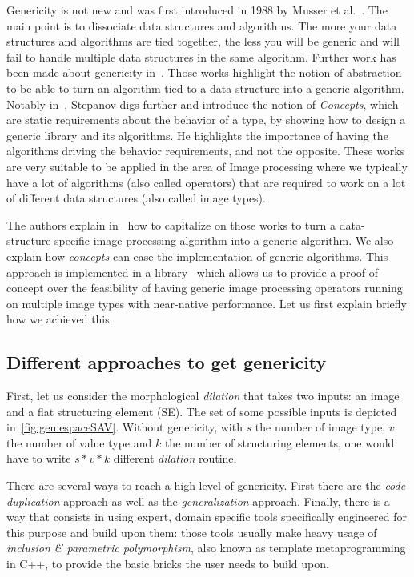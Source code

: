 Genericity is not new and was first introduced in 1988 by Musser et al.~\parencite{musser.1988.generic}. The main point
is to dissociate data structures and algorithms. The more your data structures and algorithms are tied together, the
less you will be generic and will fail to handle multiple data structures in the same algorithm. Further work has been
made about genericity in~\parencite{musser.1994.algorithm,dehnert.1998.fundamentals}. Those works highlight the notion
of abstraction to be able to turn an algorithm tied to a data structure into a generic algorithm. Notably
in~\parencite{stepanov.2009.elements}, Stepanov digs further and introduce the notion of \emph{Concepts}, which are
static requirements about the behavior of a type, by showing how to design a generic library and its algorithms. He
highlights the importance of having the algorithms driving the behavior requirements, and not the opposite. These works
are very suitable to be applied in the area of Image processing where we typically have a lot of algorithms (also called
operators) that are required to work on a lot of different data structures (also called image types).

The authors explain in~\parencite{roynard.2019.rrpr} how to capitalize on those works to turn a data-structure-specific
image processing algorithm into a generic algorithm. We also explain how \emph{concepts} can ease the implementation of
generic algorithms. This approach is implemented in a library~\parencite{carlinet.2018.pylena} which allows us to
provide a proof of concept over the feasibility of having generic image processing operators running on multiple image
types with near-native performance. Let us first explain briefly how we achieved this.

\subsection{Different approaches to get genericity}
\label{subsec:different.approaches}

First, let us consider the morphological \emph{dilation} that takes two inputs: an image and a flat structuring element
(SE). The set of some possible inputs is depicted in~\ref{fig:gen.espaceSAV}. Without genericity, with \(s\) the number
of image type, \(v\) the number of value type and \(k\) the number of structuring elements, one would have to write \(s
* v * k\) different \emph{dilation} routine.

There are several ways to reach a high level of genericity. First there are the \emph{code duplication} approach as well
as the \emph{generalization} approach. Finally, there is a way that consists in using expert, domain specific tools
specifically engineered for this purpose and build upon them: those tools usually make heavy usage of \emph{inclusion
  \& parametric polymorphism}, also known as template metaprogramming in C++, to provide the basic bricks the user needs
to build upon.

